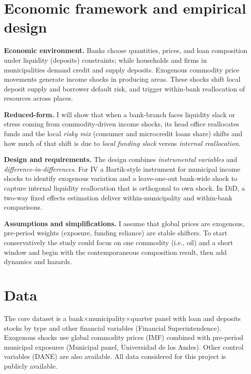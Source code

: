 \section{ Economic framework and empirical design} \label{section:efed} 

\noindent \textbf{Economic environment.} Banks choose quantities, prices, and loan composition under liquidity (deposits) constraints;  while households and firms in municipalities demand credit and supply deposits. Exogenous commodity price movements generate income shocks in producing areas. These shocks shift local deposit supply and borrower default risk, and trigger within-bank reallocation of resources across places.

\noindent \textbf{Reduced-form.} I will show that when a bank-branch faces liquidity slack or stress coming from commodity-driven income shocks, its head office reallocates funds and the local \textit{risky mix} (consumer and microcredit loans share) shifts and how much of that shift is due to \textit{local funding slack} versus \textit{internal reallocation}.
 
\noindent \textbf{Design and requirements.} The design combines \emph{instrumental variables} and \emph{difference-in-differences}. For IV a Bartik-style instrument for municipal income shocks to identify exogenous variation and a leave-one-out bank-wide shock to capture internal liquidity reallocation that is orthogonal to own shock. In DiD, a two-way fixed effects estimation deliver within-municipality and within-bank comparisons.

\noindent \textbf{Assumptions and simplifications.} I assume that global prices are exogenous, pre-period weights (exposure, funding reliance) are stable shifters. To start conservatively the study could focus on one commodity (i.e., oil) and a short window and begin with the contemporaneous composition result, then add dynamics and hazards.


\section{ Data} \label{section:data} 

The core dataset is a bank$\times$municipality$\times$quarter panel with loan and deposits stocks by type and other financial variables (Financial Superintendence). Exogenous shocks use global commodity prices (IMF) combined with pre-period municipal exposures (Municipal panel, Universidad de los Andes). Other control variables (DANE) are also available. All data considered for this project is publicly available.


\singlespacing

%

\pagebreak
\renewcommand*{\thepage}{A.\arabic{page}}
\setcounter{page}{0}
\setcounter{equation}{0}
\renewcommand{\theequation}{A.\arabic{equation}}
\setcounter{section}{0}
\renewcommand{\thesection}{A.\arabic{section}}
\renewcommand{\thefigure}{A.\arabic{figure}}
\setcounter{figure}{0}
\renewcommand{\thetable}{A.\arabic{table}}
\setcounter{table}{0}
\thispagestyle{empty}


